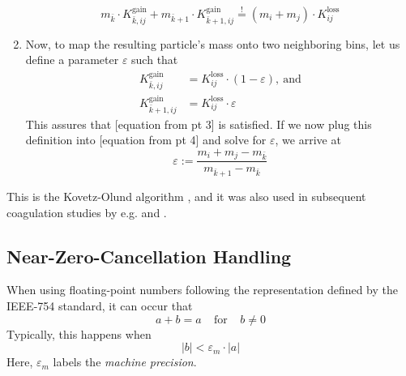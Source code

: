 \begin{enumerate}
\begin{equation}
                    m_{\bar k} \cdot K_{\bar k,ij}^\text{gain}
                    + m_{\bar k+1} \cdot K_{\bar k+1,ij}^\text{gain}
                    \overset{!}{=} (m_i+m_j) \cdot K_{ij}^\text{loss}
                \end{equation}
            \item Now, to map the resulting particle's mass onto two neighboring bins, let us    
                define a parameter $\varepsilon$ such that
                \begin{align}
                    K_{\bar k,ij}^\text{gain}
                        &=K_{ij}^\text{loss} \cdot (1-\varepsilon),\ \text{and}\\
                    K_{\bar k+1,ij}^\text{gain}
                        &=K_{ij}^\text{loss} \cdot \varepsilon
                \end{align}
                This assures that [equation from pt 3] is satisfied. If we now plug this
                definition into [equation from pt 4] and solve for $\varepsilon$, we
                arrive at
                \begin{equation}
                    \varepsilon
                        :=\frac{m_i+m_j-m_{\bar k}}{m_{\bar k+1}-m_{\bar k}}
                \end{equation}
        \end{enumerate}
        This is the Kovetz-Olund algorithm \cite{kovetz_olund_1969}, and it was also used in subsequent 
        coagulation studies by e.g. \cite{brauer_dullemond_henning_2007} and 
        \cite{birnstiel_dullemond_brauer_2010}.
    
    \clearpage\subsection{Near-Zero-Cancellation Handling}
    
        When using floating-point numbers following the representation defined
        by the IEEE-754 standard, it can occur that
        \begin{equation}
          a+b=a
          \ \ \ \ \ \text{for} \ \ \ \ \
          b\neq0
        \end{equation}
        Typically, this happens when
        \begin{equation}
            |b|<\varepsilon_m\cdot|a|
        \end{equation}
        Here, $\varepsilon_m$ labels the \textit{machine precision}.
        \\
        
